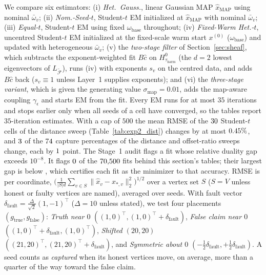 \documentclass[11pt,a4paper]{article}
\theoremstyle{definition}
\theoremstyle{remark}
\begin{document}
We compare six estimators: (i) \emph{Het.\ Gauss.}, linear Gaussian MAP $\hat{x}_{\mathrm{MAP}}$ using nominal $\bar{\omega}_v$; (ii) \emph{Nom.-Seed-$t$}, Student-$t$ EM initialized at $\hat{x}_{\mathrm{MAP}}$ with nominal $\bar{\omega}_v$; (iii) \emph{Equal-$t$}, Student-$t$ EM using fixed $\omega_{\mathrm{base}}$ throughout; (iv) \emph{Fixed-Warm Het.-$t$}, uncentred Student-$t$ EM initialized at the fixed-scale warm start $x^{(0)}$ ($\omega_{\mathrm{base}}$) and updated with heterogeneous $\bar{\omega}_v$; (v) the \emph{two-stage filter} of Section~\ref{sec:sheaf}, which subtracts the exponent-weighted fit $B\hat{c}$ on $H^0_{\tau_{\mathrm{harm}}}$ (the $d=2$ lowest eigenvectors of $L_{\widetilde{\mathcal{F}}}$), runs (iv) with exponents $s_v$ on the centred data, and adds $B\hat{c}$ back ($s_v \equiv 1$ unless Layer~1 supplies exponents); and (vi) the \emph{three-stage variant}, which is given the generating value $\sigma_{\mathrm{map}} = 0.01$, adds the map-aware coupling $\gamma_\epsilon$ and starts EM from the fit. Every EM runs for at most $35$ iterations and stops earlier only when all seeds of a cell have converged, so the tables report $35$-iteration estimates. With a cap of $500$ the mean RMSE of the $30$ Student-$t$ cells of the distance sweep (Table~\ref{tab:exp2_dist}) changes by at most $0.45\%$, and $3$ of the $74$ capture percentages of the distance and offset-ratio sweeps change, each by $1$ point. The Stage~1 audit flags a fit whose relative duality gap exceeds $10^{-8}$. It flags $0$ of the $70{,}500$ fits behind this section's tables; their largest gap is below \resStageOneGapCert{}, which certifies each fit as the minimizer to that accuracy. RMSE is per coordinate, $\bigl(\frac{1}{|S|d}\sum_{v \in S}\|\hat{x}_v - x_{*,v}\|_2^2\bigr)^{1/2}$ over a vertex set $S$ ($S = V$ unless honest or faulty vertices are named), averaged over seeds. With fault vector $\delta_{\mathrm{fault}} = \frac{\Delta}{\sqrt{2}}(1, -1)^\top$ ($\Delta = 10$ unless stated), we test four placements $(g_{\mathrm{true}}, g_{\mathrm{false}})$: \emph{Truth near $0$} $((1,0)^\top, (1,0)^\top + \delta_{\mathrm{fault}})$, \emph{False claim near $0$} $((1,0)^\top + \delta_{\mathrm{fault}}, (1,0)^\top)$, \emph{Shifted $(20,20)$} $((21,20)^\top, (21,20)^\top + \delta_{\mathrm{fault}})$, and \emph{Symmetric about $0$} $(-\tfrac{1}{2}\delta_{\mathrm{fault}}, +\tfrac{1}{2}\delta_{\mathrm{fault}})$. A seed counts as \emph{captured} when its honest vertices move, on average, more than a quarter of the way toward the false claim.
\end{document}
